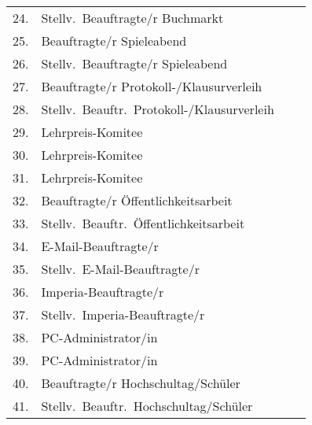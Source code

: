 \documentclass[sitzung=fsv-konstituierend]{fsphys-protokoll}
\begin{document}
\begin{longtable}{| r @{ } l | l | c |}
		& &
	\\ \hline
	24. & Stellv.\ Beauftragte/r Buchmarkt
		& &
	\\ \hline
	25. & Beauftragte/r Spieleabend
		& &
	\\ \hline
	26. & Stellv.\ Beauftragte/r Spieleabend
		& &
	\\ \hline
	27. & Beauftragte/r Protokoll-/Klausurverleih
		& &
	\\ \hline
	28. & Stellv.\ Beauftr.\ Protokoll-/Klausurverleih
		& &
	\\ \hline
	29. & Lehrpreis-Komitee
		& &
	\\ \hline
	30. & Lehrpreis-Komitee
		& &
	\\ \hline
	31. & Lehrpreis-Komitee
		& &
	\\ \hline
	32. & Beauftragte/r Öffentlichkeitsarbeit
		& &
	\\ \hline
	33. & Stellv.\ Beauftr.\ Öffentlichkeitsarbeit
		& &
	\\ \hline
	34. & E-Mail-Beauftragte/r
		& &
	\\ \hline
	35. & Stellv.\ E-Mail-Beauftragte/r
		& &
	\\ \hline
	36. & Imperia-Beauftragte/r
		& &
	\\ \hline
	37. & Stellv.\ Imperia-Beauftragte/r
		& &
	\\ \hline
	38. & PC-Administrator/in
		& &
	\\ \hline
	39. & PC-Administrator/in
		& &
	\\ \hline
	40. & Beauftragte/r Hochschultag/Schüler
		& &
	\\ \hline
	41. & Stellv.\ Beauftr.\ Hochschultag/Schüler
		& &
	\\ \hline
\end{longtable}

\clearpage

\appendix
\end{document}
